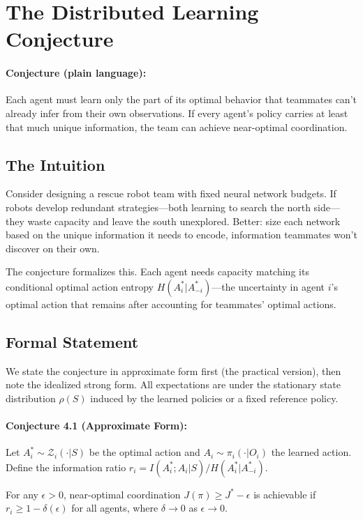 \documentclass[10pt, letterpaper]{article}
\begin{document}
\section{The Distributed Learning Conjecture}
\label{sec:conjecture}

\paragraph{Conjecture (plain language):} Each agent must learn only the part of its optimal behavior that teammates can't already infer from their own observations. If every agent's policy carries at least that much unique information, the team can achieve near-optimal coordination.

\subsection{The Intuition}

Consider designing a rescue robot team with fixed neural network budgets. If robots develop redundant strategies---both learning to search the north side---they waste capacity and leave the south unexplored. Better: size each network based on the unique information it needs to encode, information teammates won't discover on their own.

The conjecture formalizes this. Each agent needs capacity matching its conditional optimal action entropy $H(A_i^*|A_{-i}^*)$---the uncertainty in agent $i$'s optimal action that remains after accounting for teammates' optimal actions.

\subsection{Formal Statement}

We state the conjecture in approximate form first (the practical version), then note the idealized strong form. All expectations are under the stationary state distribution $\rho(S)$ induced by the learned policies or a fixed reference policy.

\paragraph{Conjecture 4.1 (Approximate Form):} Let $A_i^* \sim \mathcal{Z}_i(\cdot|S)$ be the optimal action and $A_i \sim \pi_i(\cdot|O_i)$ the learned action. Define the information ratio $r_i = I(A_i^*; A_i | S) / H(A_i^* | A_{-i}^*)$.

For any $\epsilon > 0$, near-optimal coordination $J(\pi) \geq J^* - \epsilon$ is achievable if $r_i \geq 1 - \delta(\epsilon)$ for all agents, where $\delta \to 0$ as $\epsilon \to 0$.
\end{document}
